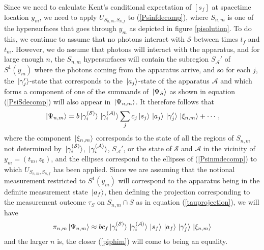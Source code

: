 Since we need to calculate Kent's conditional expectation of $[s_f]$ at spacetime location $y_m$, we need to apply  $U_{S_{n,m},S_{n,f}}$ to (\ref{Psinfdecomp}), where $S_{n,m}$ %
%
 is one of the hypersurfaces that goes through $y_m$ as depicted in figure \ref{pisolution}. To do this, we continue to assume that no photons interact with $\mathcal{S}$ between times $t_f$ and $t_m$. However, we do assume that photons will interact with the apparatus, and for large enough $n$, the $S_{n,m}$ hypersurfaces will contain the subregion $S_{\mathcal{A}}'$ of $S^1(y_m)$ where the photons coming from the apparatus arrive, and so for each $j$, the $\ket*{\gamma_j'}$-state %
%
 that corresponds to the $\ket*{a_j}$-state of the apparatus $\mathcal{A}$ and which forms a component of one of the summands of $\ket*{\Psi_S}$ as shown in equation (\ref{PsiSdecomp}) will also appear in $\ket*{\Psi_{n,m}}$. It therefore follows that 
\begin{equation}\label{Psinmdecomp}
	\ket*{\Psi_{n,m}}=b\ket*{\gamma_i^{(\mathcal{S})}}\ket*{\gamma_i^{(\mathcal{A})}}\sum_j c_j \ket*{s_j}\ket*{a_j}\ket*{\gamma_j'}\ket*{\xi_{n,m}}+\cdots,
\end{equation} 
where the component $\ket*{\xi_{n,m}}$ %
%
 corresponds to the state of all the regions of $S_{n,m}$ not determined by $\ket*{\gamma_i^{(\mathcal{S})}}$, $\ket*{\gamma_i^{(\mathcal{A})}}$,  $S_{\mathcal{A}}'$, or the state of $\mathcal{S}$ and $\mathcal{A}$ in the vicinity of $y_m=(t_m, z_0)$, and the ellipses correspond to the ellipses of (\ref{Psinmdecomp}) to which $U_{S_{n,m},S_{n,f}}$ has been applied. Since we are assuming that the notional measurement restricted to $S^1(y_m)$ will correspond to the apparatus being in the definite measurement state $\ket*{a_f}$, then defining the projection corresponding to the measurement outcome $\tau_S$ on $S_{n,m}\cap S$ as in equation (\ref{tauprojection}), we will have
\begin{equation}\label{piphim}
\pi_{n,m}\ket*{\Psi_{n,m}}\approx b c_f \ket*{\gamma_i^{(\mathcal{S})}}\ket*{\gamma_i^{(\mathcal{A})}}\ket*{s_f}\ket*{a_f}\ket*{\gamma_f'}\ket*{\xi_{n,m}}
\end{equation}
and the larger $n$ is, the closer (\ref{piphim}) will come to being an equality. 

